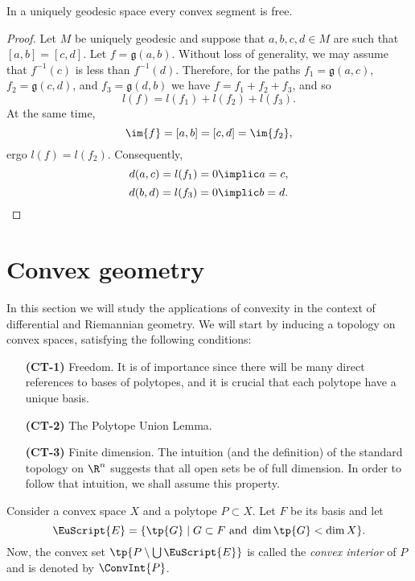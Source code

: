 \documentclass[12pt, a4paper]{article}
\newcommand{\E}{\EuScript{E}}
\newcommand{\g}{\mathfrak{g}}
\begin{document}
\begin{lemma}\label{unigeo-3}
    In a uniquely geodesic space every convex segment is free.
\end{lemma}
\begin{proof}
    Let \(M\) be uniquely geodesic and suppose that \(a, b, c, d \in M\) are such that \([a, b] = [c, d]\). Let \(f = \g(a, b)\). Without loss of generality, we may assume that \(f^{-1}(c)\) is less than \(f^{-1}(d)\). Therefore, for the paths \(f_1 = \g(a, c)\), \(f_2 = \g(c, d)\), and \(f_3 = \g(d, b)\) we have \(f = f_1 + f_2 + f_3\), and so \[l(f) = l(f_1) + l(f_2) + l(f_3).\] At the same time, \[\im{f} = [a, b] = [c, d] = \im{f_2},\] ergo \(l(f) = l(f_2)\). Consequently, \[d(a, c) = l(f_1) = 0 \implic a = c,\] \[d(b, d) = l(f_3) = 0 \implic b = d.\] 
\end{proof}



















\section{Convex geometry}

In this section we will study the applications of convexity in the context of differential and Riemannian geometry. We will start by inducing a topology on convex spaces, satisfying the following conditions:

\begin{itemize}\label{CT}
    \item[\textbf{(CT-1)}] Freedom. It is of importance since there will be many direct references to bases of polytopes, and it is crucial that each polytope have a unique basis.
    \item[\textbf{(CT-2)}] The Polytope Union Lemma.
    \item[\textbf{(CT-3)}] Finite dimension. The intuition (and the definition) of the standard topology on \(\R^n\) suggests that all open sets be of full dimension. In order to follow that intuition, we shall assume this property.
\end{itemize}

\begin{definition}\label{def-poly-int}
    Consider a convex space \(X\) and a polytope \(P \subset X\). Let \(F\) be its basis and let \[\E = \{\tp{G} \mid G \subset F \mbox{ and } \dim \tp{G} < \dim X\}.\] Now, the convex set \(\tp{P \setminus \bigcup \E}\) is called the \textit{convex interior} of \(P\) and is denoted by \(\ConvInt{P}\). 
\end{definition}
\end{document}
